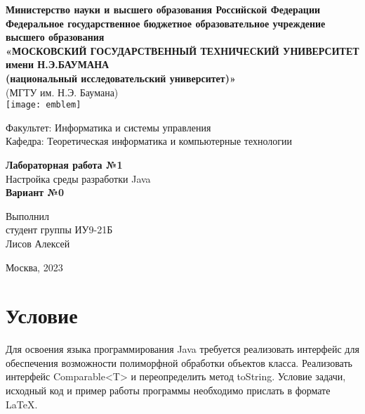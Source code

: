 \documentclass[12pt,a4paper,oneside,titlepage] {article}
\begin{document}
\begin{center}
  \hfill 
  \break
  \textbf{
    \footnotesize{Министерство науки и высшего образования Российской Федерации}\\
    \hfill \break
    \footnotesize{Федеральное государственное бюджетное образовательное учреждение высшего образования}\\
    \small{«МОСКОВСКИЙ ГОСУДАРСТВЕННЫЙ ТЕХНИЧЕСКИЙ УНИВЕРСИТЕТ имени Н.Э.БАУМАНА\\(национальный исследовательский университет)»}}\\
    \footnotesize{(МГТУ им. Н.Э. Баумана)}\\
    \texttt{[image: emblem]}
\end{center}
\hfill 
\break
\normalsize{Факультет: Информатика и системы управления}\\
\hfill \break
\normalsize{Кафедра: Теоретическая информатика и компьютерные технологии}\\
\hfill\break
\begin{center}
  \textbf{\large{Лабораторная работа №1}}\\
  \large{Настройка среды разработки Java}\\
  \textbf{\large{Вариант №0}}\\
\end{center}
\hfill \break
\hfill \break
\hfill \break
\hfill \break
\hfill \break
\hfill \break
\hfill \break
\hfill \break
\begin{flushright}
  \normalsize{
    Выполнил\\
    студент группы ИУ9-21Б\\
    Лисов Алексей
  }
\end{flushright}

\hfill \break
\begin{center} Москва, 2023 \end{center}
\thispagestyle{empty} %

\section{Условие}
Для освоения языка программирования Java требуется реализовать интерфейс для обеспечения возможности полиморфной обработки объектов класса. Реализовать интерфейс Comparable<T> и переопределить метод toString. Условие задачи, исходный код и пример работы программы необходимо прислать в формате \LaTeX.
\end{document}
